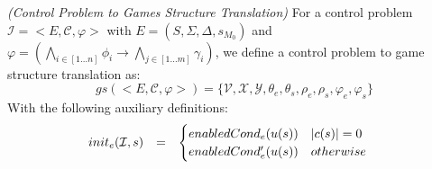 \begin{definition}\label{def:cp2gs}\emph{(Control Problem to Games Structure Translation)}
For a control problem $\mathcal{I}= <E, \mathcal{C}, \varphi>$ with
$E = (S, \Sigma, \Delta, s_{M_0})$ and 
$\varphi = (\bigwedge_{i \in [1 \ldots n]} \phi_i \rightarrow \bigwedge_{j \in [1\ldots m]}\gamma_i)$, we define a control problem to game structure translation as:
\[
gs(<E,\mathcal{C},\varphi>) = \{\mathcal{V},\mathcal{X},\mathcal{Y},\theta_e, \theta_s,\rho_e,\rho_s, \varphi_e, \varphi_s\}\]
With the following auxiliary definitions:
\[
\begin{array}{r c l}
init_e(\mathcal{I},s) &=&
\begin{cases}
enabledCond_e(u(s)) \quad |c(s)| = 0\\
enabledCond'_e(u(s)) \quad otherwise\\
\end{cases}\\


\end{array}\]
\end{definition}
